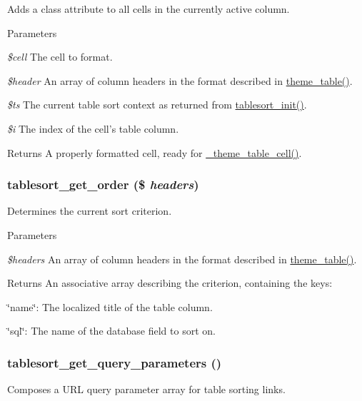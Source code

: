 Adds a class attribute to all cells in the currently active column.


\begin{DoxyParams}{Parameters}
\item[{\em \$cell}]The cell to format. \item[{\em \$header}]An array of column headers in the format described in \hyperlink{group__themeable_ga9e35aa108c35f87b588197138a51823d}{theme\_\-table()}. \item[{\em \$ts}]The current table sort context as returned from \hyperlink{tablesort_8inc_afee7fc97d83c8e51399e9b41ccbae927}{tablesort\_\-init()}. \item[{\em \$i}]The index of the cell's table column.\end{DoxyParams}
\begin{DoxyReturn}{Returns}
A properly formatted cell, ready for \hyperlink{includes_2theme_8inc_adf2a29e2c6631b7c0ecd833cafda9b40}{\_\-theme\_\-table\_\-cell()}. 
\end{DoxyReturn}
\hypertarget{tablesort_8inc_a185527ebc6d0d3f4b8681b60debddf21}{
\subsubsection[{tablesort\_\-get\_\-order}]{\setlength{\rightskip}{0pt plus 5cm}tablesort\_\-get\_\-order (\$ {\em headers})}}
\label{tablesort_8inc_a185527ebc6d0d3f4b8681b60debddf21}
Determines the current sort criterion.


\begin{DoxyParams}{Parameters}
\item[{\em \$headers}]An array of column headers in the format described in \hyperlink{group__themeable_ga9e35aa108c35f87b588197138a51823d}{theme\_\-table()}.\end{DoxyParams}
\begin{DoxyReturn}{Returns}
An associative array describing the criterion, containing the keys:
\begin{DoxyItemize}
\item \char`\"{}name\char`\"{}: The localized title of the table column.
\item \char`\"{}sql\char`\"{}: The name of the database field to sort on. 
\end{DoxyItemize}
\end{DoxyReturn}
\hypertarget{tablesort_8inc_a25f3317225870d1ed7dea582f57dd950}{
\subsubsection[{tablesort\_\-get\_\-query\_\-parameters}]{\setlength{\rightskip}{0pt plus 5cm}tablesort\_\-get\_\-query\_\-parameters ()}}
\label{tablesort_8inc_a25f3317225870d1ed7dea582f57dd950}
Composes a URL query parameter array for table sorting links.


